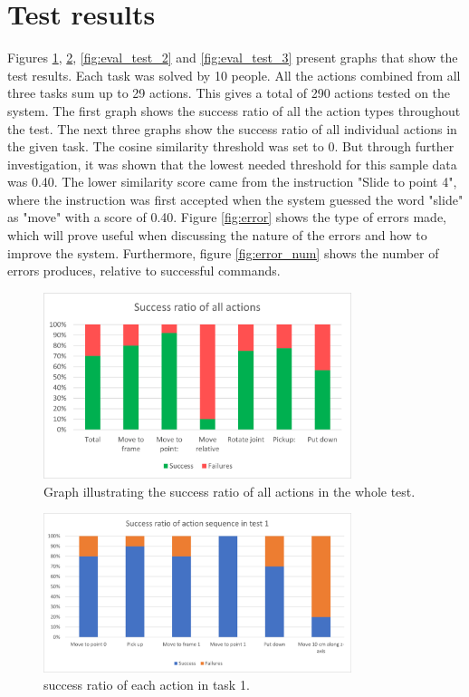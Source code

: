 \section{Test results}
Figures \ref{fig:eval_test_TOTAL}, \ref{fig:eval_test_1}, \ref{fig:eval_test_2} and \ref{fig:eval_test_3} present graphs that show the test results. Each task was solved by 10 people. All the actions combined from all three tasks sum up to 29 actions. This gives a total of 290 actions tested on the system. The first graph shows the success ratio of all the action types throughout the test. The next three graphs show the success ratio of all individual actions in the given task. The cosine similarity threshold was set to 0. But through further investigation, it was shown that the lowest needed threshold for this sample data was 0.40. The lower similarity score came from the instruction "Slide to point 4", where the instruction was first accepted when the system guessed the word "slide" as "move" with a score of 0.40.
Figure \ref{fig:error} shows the type of errors made, which will prove useful when discussing the nature of the errors and how to improve the system. Furthermore, figure \ref{fig:error_num} shows the number of errors produces, relative to successful commands.

\begin{figure}[ht]
    \centering
    \includegraphics[width=9cm]{img/test_results_TOTAL.png}
    \caption{Graph illustrating the success ratio of all actions in the whole test.}
    \label{fig:eval_test_TOTAL}
\end{figure}



\begin{figure}[ht]
    \centering
    \includegraphics[width=9cm]{img/test_results_1.png}
    \caption{success ratio of each action in task 1.}
    \label{fig:eval_test_1}
\end{figure}

